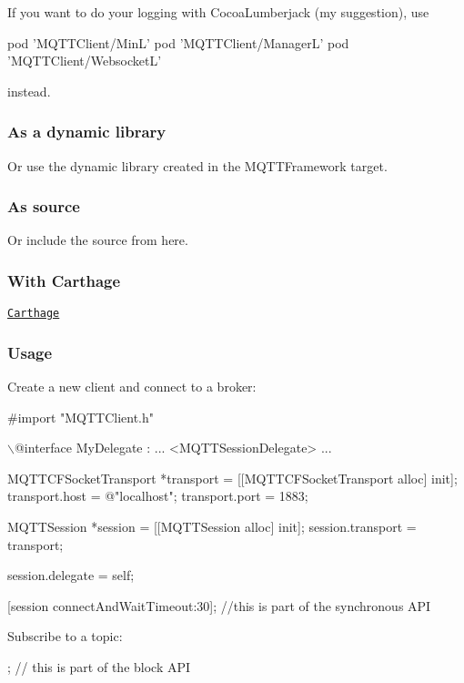 If you want to do your logging with Cocoa\+Lumberjack (my suggestion), use 
\begin{DoxyCode}
pod 'MQTTClient/MinL'
pod 'MQTTClient/ManagerL'
pod 'MQTTClient/WebsocketL'
\end{DoxyCode}
 instead.

\subsubsection*{As a dynamic library}

Or use the dynamic library created in the M\+Q\+T\+T\+Framework target.

\subsubsection*{As source}

Or include the source from here.

\subsubsection*{With Carthage}

\href{https://github.com/Carthage/Carthage}{\tt Carthage}

\subsubsection*{Usage}

Create a new client and connect to a broker\+:


\begin{DoxyCode}
#import "MQTTClient.h"

\(\backslash\)@interface MyDelegate : ... <MQTTSessionDelegate>
...

        MQTTCFSocketTransport *transport = [[MQTTCFSocketTransport alloc] init];
        transport.host = @"localhost";
        transport.port = 1883;

        MQTTSession *session = [[MQTTSession alloc] init];
        session.transport = transport;

    session.delegate = self;

    [session connectAndWaitTimeout:30];  //this is part of the synchronous API
\end{DoxyCode}


Subscribe to a topic\+:


\begin{DoxyCode}
; // this is part of the block API
\end{DoxyCode}


